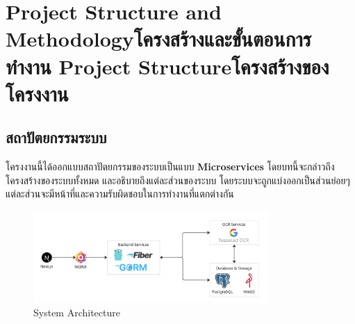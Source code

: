 \chapter{\ifproject%
\ifenglish Project Structure and Methodology\else โครงสร้างและขั้นตอนการทำงาน\fi
\else%
\ifenglish Project Structure\else โครงสร้างของโครงงาน\fi
\fi
}

\makeatletter


\makeatother

\section{สถาปัตยกรรมระบบ}
  \qquad โครงงานนี้ได้ออกแบบสถาปัตยกรรมของระบบเป็นแบบ \textbf{Microservices} โดยบทนี้จะกล่าวถึง
    โครงสร้างของระบบทั้งหมด และอธิบายถึงแต่ละส่วนของระบบ โดยระบบจะถูกแบ่งออกเป็นส่วนย่อยๆ 
    แต่ละส่วนจะมีหน้าที่และความรับผิดชอบในการทำงานที่แตกต่างกัน

    \begin{figure}[!ht]
      \centering
      \includegraphics[width=0.8\textwidth]{image/Approach/Architecture.png}
      \caption[Architecture]{System Architecture}
      \label{fig:architecture}
    \end{figure}
    \FloatBarrier

